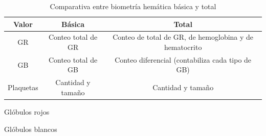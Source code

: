 \begin{table}\centering
    \caption{Comparativa entre biometría hemática básica y total}
    \label{tab:comparativa_entre_biometria_basica_y_total}
    \begin{threeparttable}
    {\tabstyle
    \begin{tabular}{ccc}\hline
        \textbf{Valor} & \textbf{Básica} & \textbf{Total} \\ \hline
    
        GR\tnote{1} & Conteo total de GR &  Conteo de total de GR, de hemoglobina y de hematocrito \\    
        GB\tnote{2} & Conteo total de GB & Conteo diferencial (contabiliza cada tipo de GB) \\
        Plaquetas   & Cantidad y tamaño  & Cantidad y tamaño \\
    \hline\end{tabular}}

\begin{tablenotes}
    \item[1] Glóbulos rojos
    \item[2] Glóbulos blancos
\end{tablenotes}

\end{threeparttable}
\end{table}